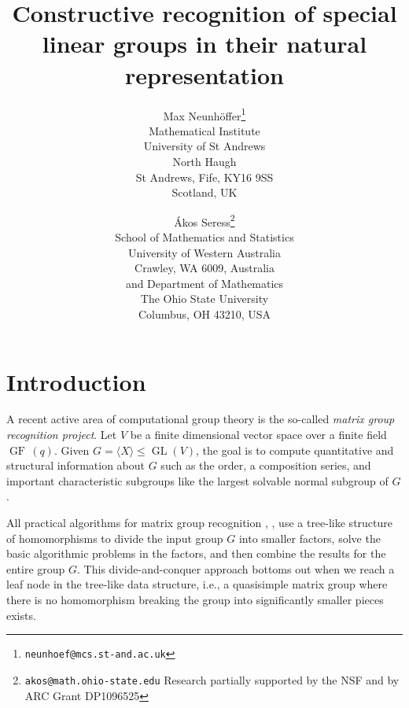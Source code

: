 \documentclass[a4paper,11pt]{article}
\def\GF{\operatorname{GF\,}}
\def\GL{\operatorname{GL}}
\begin{document}
\title{Constructive recognition of special linear groups in their natural representation}

\author{Max Neunh\"offer\footnote{\texttt{neunhoef@mcs.st-and.ac.uk}} \\
Mathematical Institute \\
University of St Andrews\\
North Haugh \\
St Andrews, Fife, KY16 9SS\\ Scotland, UK \\ \and \'Akos Seress\footnote{\texttt{akos@math.ohio-state.edu}  Research partially supported by the NSF and by ARC Grant DP1096525}  \\ School of Mathematics and Statistics \\ University of Western Australia \\ Crawley, WA 6009, Australia \\ and  Department of Mathematics \\ The Ohio State University \\ Columbus, OH 43210, USA}

\date{}
\maketitle



\begin{abstract}

\end{abstract}

\section{Introduction}
\label{introduction}
A recent active area of computational group theory is the so-called
{\em matrix group recognition project}. Let $V$ be a finite dimensional
vector space over a finite field $\GF(q)$. Given $G =\langle X \rangle
\le \GL(V)$, the goal is to compute quantitative and structural
information about $G$ such as the order, a composition series, and
important characteristic subgroups like the largest solvable normal
subgroup of $G$.

All practical algorithms for matrix group recognition \cite{LG99},
\cite{NS06}, \cite{OB09} use a tree-like structure of homomorphisms
to divide the input group $G$ into smaller factors, solve the basic
algorithmic problems in the factors, and then combine the results for
the entire group $G$. This divide-and-conquer approach bottoms out
when we reach a leaf node in the tree-like data structure, i.e., a
quasisimple matrix group where there is no homomorphism breaking the
group into significantly smaller pieces exists.
\end{document}
